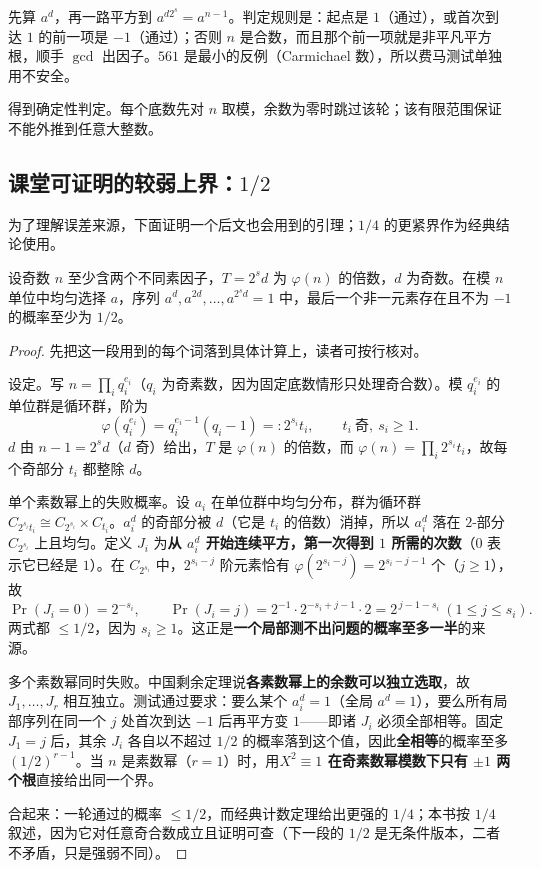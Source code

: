 \begin{tip}[读一条测试链的方法]
先算 $a^d$，再一路平方到 $a^{d2^s}=a^{n-1}$。判定规则是：起点是 $1$（通过），或首次到达 $1$ 的前一项是 $-1$（通过）；否则 $n$ 是合数，而且那个前一项就是非平凡平方根，顺手 $\gcd$ 出因子。$561$ 是最小的反例（Carmichael 数），所以费马测试单独用不安全。
\end{tip}

得到确定性判定。每个底数先对 $n$ 取模，余数为零时跳过该轮；该有限范围保证不能外推到任意大整数。


\subsection{课堂可证明的较弱上界：\texorpdfstring{$1/2$}{1/2}}
为了理解误差来源，下面证明一个后文也会用到的引理；$1/4$ 的更紧界作为经典结论使用。
\begin{lemma}[已知群指数倍数时的平方根分裂]
设奇数 $n$ 至少含两个不同素因子，$T=2^s d$ 为 $\varphi(n)$ 的倍数，$d$ 为奇数。在模 $n$ 单位中均匀选择 $a$，序列 $a^d,a^{2d},\ldots,a^{2^sd}=1$ 中，最后一个非一元素存在且不为 $-1$ 的概率至少为 $1/2$。
\end{lemma}
\begin{proof}
先把这一段用到的每个词落到具体计算上，读者可按行核对。

设定。写 $n=\prod_i q_i^{e_i}$（$q_i$ 为奇素数，因为固定底数情形只处理奇合数）。模 $q_i^{e_i}$ 的单位群是循环群，阶为
\[
 \varphi(q_i^{e_i})=q_i^{e_i-1}(q_i-1)=:2^{s_i}t_i,\qquad t_i\ \text{奇},\ s_i\ge1 .
\]
$d$ 由 $n-1=2^s d$（$d$ 奇）给出，$T$ 是 $\varphi(n)$ 的倍数，而 $\varphi(n)=\prod_i2^{s_i}t_i$，故每个奇部分 $t_i$ 都整除 $d$。

单个素数幂上的失败概率。设 $a_i$ 在单位群中均匀分布，群为循环群 $C_{2^{s_i}t_i}\cong C_{2^{s_i}}\times C_{t_i}$。$a_i^d$ 的奇部分被 $d$（它是 $t_i$ 的倍数）消掉，所以 $a_i^d$ 落在 $2$-部分 $C_{2^{s_i}}$ 上且均匀。定义 $J_i$ 为\textbf{从 $a_i^d$ 开始连续平方，第一次得到 $1$ 所需的次数}（$0$ 表示它已经是 $1$）。在 $C_{2^{s_i}}$ 中，$2^{s_i-j}$ 阶元素恰有 $\varphi(2^{s_i-j})=2^{s_i-j-1}$ 个（$j\ge1$），故
\[
 \Pr(J_i=0)=2^{-s_i},\qquad \Pr(J_i=j)=2^{-1}\cdot2^{-s_i+j-1}\cdot2=2^{\,j-1-s_i}\ (1\le j\le s_i).
\]
两式都 $\le1/2$，因为 $s_i\ge1$。这正是\textbf{一个局部测不出问题的概率至多一半}的来源。

多个素数幂同时失败。中国剩余定理说\textbf{各素数幂上的余数可以独立选取}，故 $J_1,\ldots,J_r$ 相互独立。测试通过要求：要么某个 $a_i^d=1$（全局 $a^d=1$），要么所有局部序列在同一个 $j$ 处首次到达 $-1$ 后再平方变 $1$——即诸 $J_i$ 必须全部相等。固定 $J_1=j$ 后，其余 $J_i$ 各自以不超过 $1/2$ 的概率落到这个值，因此\textbf{全相等}的概率至多 $(1/2)^{r-1}$。当 $n$ 是素数幂（$r=1$）时，用\textbf{$X^2\equiv1$ 在奇素数幂模数下只有 $\pm1$ 两个根}直接给出同一个界。

合起来：一轮通过的概率 $\le1/2$，而经典计数定理给出更强的 $1/4$；本书按 $1/4$ 叙述，因为它对任意奇合数成立且证明可查（下一段的 $1/2$ 是无条件版本，二者不矛盾，只是强弱不同）。
\end{proof}
